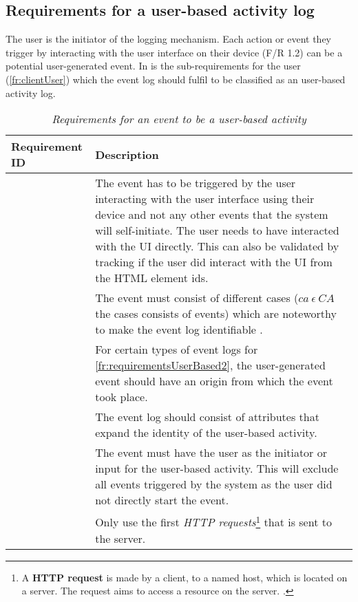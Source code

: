 \subsection{Requirements for a user-based activity log}\label{sec:ch2_requirementsOfUAT}
The user is the initiator of the logging mechanism. Each action or event they trigger by interacting with the user interface on their device (F/R 1.2) can be a potential user-generated event. In
 is the sub-requirements for the user (\ref{fr:clientUser}) which the event log should fulfil to be classified as an user-based activity log.

\setcounter{phase}{1}
\setcounter{subphase}{1}
\begin{table}[!htb]
	\centering
	\caption[Requirements for an event to be a user-based activity]
	{\textit{Requirements for an event to be a user-based activity}}
	\label{tbl:ch2_requirementsForUserActivtyEvent}
	\begin{tabularx}{\textwidth}{|l|X|}
		\hline \textbf{Requirement ID} & \textbf{Description}\\
		\hline \subsubphase{fr:requirementsUserBased1} & The event has to be triggered by the user interacting with the user interface using their device and not any other events that the system will self-initiate. The user needs to have interacted with the UI directly. This can also be validated by tracking if the user did interact with the UI from the HTML element ids. \\
		\hline \subsubphase{fr:requirementsUserBased2} & The event must consist of different cases ($ca~ \epsilon~CA$ the cases consists of events) which are noteworthy to make the event log identifiable \cite{Slaninova2014}. \\
		\hline \subsubphase{fr:requirementsUserBased3} & For certain types of event logs for \ref{fr:requirementsUserBased2}, the user-generated event should have an origin from which the event took place. \\
		\hline \subsubphase{fr:requirementsUserBased4} & The event log should consist of attributes that expand the identity of the user-based activity. \\
		\hline \subsubphase{fr:requirementsUserBased5} & The event must have the user as the initiator or input for the user-based activity. This will exclude all events triggered by the system as the user did not directly start the event. \\
		\hline \subsubphase{fr:requirementsUserBased6} & Only use the first \textit{HTTP requests}\footnote{A \textbf{HTTP request} is made by a client, to a named host, which is located on a server. The request aims to access a resource on the server. \cite{IBM2021}.} that is sent to the server. \\ 
		\hline
	\end{tabularx}
\end{table}


